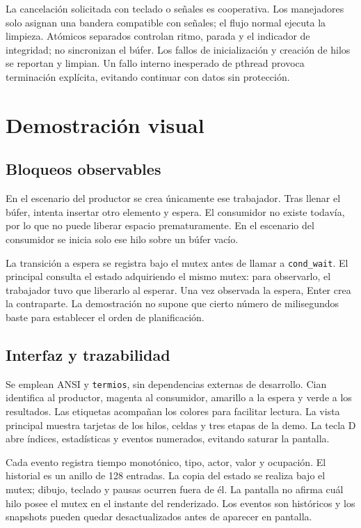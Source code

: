\documentclass[conference]{IEEEtran}
\begin{document}
La cancelación solicitada con teclado o señales es cooperativa. Los manejadores
solo asignan una bandera compatible con señales; el flujo normal ejecuta la
limpieza. Atómicos separados controlan ritmo, parada y el indicador de integridad;
no sincronizan el búfer. Los fallos de inicialización y creación de hilos se
reportan y limpian. Un fallo interno inesperado de pthread provoca terminación
explícita, evitando continuar con datos sin protección.

\section{Demostración visual}
\subsection{Bloqueos observables}
En el escenario del productor se crea únicamente ese trabajador. Tras llenar el
búfer, intenta insertar otro elemento y espera. El consumidor no existe todavía,
por lo que no puede liberar espacio prematuramente. En el escenario del consumidor
se inicia solo ese hilo sobre un búfer vacío.

La transición a espera se registra bajo el mutex antes de llamar a
\texttt{cond\_wait}. El principal consulta el estado adquiriendo el mismo mutex:
para observarlo, el trabajador tuvo que liberarlo al esperar. Una vez observada
la espera, Enter crea la contraparte. La demostración no supone que cierto número
de milisegundos baste para establecer el orden de planificación.

\subsection{Interfaz y trazabilidad}
Se emplean ANSI y \texttt{termios}, sin dependencias externas de desarrollo.
Cian identifica al productor, magenta al consumidor, amarillo a la espera y verde
a los resultados. Las etiquetas acompañan los colores para facilitar lectura.
La vista principal muestra tarjetas de los hilos, celdas y tres etapas de la demo.
La tecla D abre índices, estadísticas y eventos numerados, evitando saturar la pantalla.

Cada evento registra tiempo monotónico, tipo, actor, valor y ocupación. El historial
es un anillo de 128 entradas. La copia del estado se realiza bajo el mutex; dibujo,
teclado y pausas ocurren fuera de él. La pantalla no afirma cuál hilo posee el
mutex en el instante del renderizado. Los eventos son históricos y los snapshots
pueden quedar desactualizados antes de aparecer en pantalla.
\end{document}
